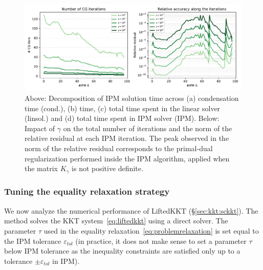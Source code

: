 \begin{figure}[!ht]
  \centering
  \includegraphics[width=\textwidth]{figures/hybrid-gamma.pdf}
  \caption{
    Above: Decomposition of IPM solution time across
    (a) condensation time (cond.), (b) \CG time, (c) total time
    spent in the linear solver (linsol.) and (d) total time spent in
    IPM solver (IPM).
    Below: Impact of $\gamma$ on the total number of \CG iterations
    and the norm of the relative residual at each IPM iteration.
    The peak observed in the norm of the relative residual corresponds
    to the primal-dual regularization performed inside the IPM algorithm,
    applied when the matrix $K_\gamma$ is not positive definite.
    \label{fig:hybrid:gamma}
  }
\end{figure}


\subsubsection{Tuning the equality relaxation strategy}
We now analyze the numerical performance of LiftedKKT (\S\ref{sec:kkt:sckkt}).
The method solves the KKT system~\eqref{eq:liftedkkt} using a direct solver.
The parameter $\tau$ used in the equality relaxation~\eqref{eq:problemrelaxation}
is set equal to the IPM tolerance $\varepsilon_{tol}$ (in practice, it does not
make sense to set a parameter $\tau$ below IPM tolerance as the
inequality constraints are satisfied only up to a tolerance $\pm \varepsilon_{tol}$
in IPM).

